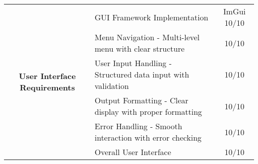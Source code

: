 \begin{center}
\begin{table}[H]
\begin{tabularx}{\textwidth}{| c | X | c |}
			\multirow{6}{*}{\parbox{4cm}{\centering\textbf{User Interface Requirements}}}
			               & GUI Framework Implementation                                                       & ImGui 10/10       \\
			\cline{2-3}
			               & Menu Navigation - Multi-level menu with clear structure                            & 10/10             \\
			\cline{2-3}
			               & User Input Handling - Structured data input with validation                        & 10/10             \\
			\cline{2-3}
			               & Output Formatting - Clear display with proper formatting                           & 10/10             \\
			\cline{2-3}
			               & Error Handling - Smooth interaction with error checking                            & 10/10             \\
			\cline{2-3}
			               & Overall User Interface                                                             & 10/10             \\
			\hline
		\end{tabularx}
	\end{table}
\end{center}

